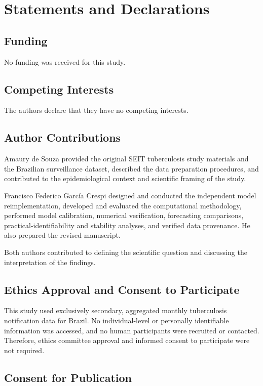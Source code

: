 \documentclass[pdflatex,sn-mathphys-ay]{sn-jnl}
\begin{document}
\section{Statements and Declarations}

\subsection{Funding}

No funding was received for this study.

\subsection{Competing Interests}

The authors declare that they have no competing interests.


\subsection{Author Contributions}

Amaury de Souza provided the original SEIT tuberculosis study materials and the Brazilian surveillance dataset, described the data preparation procedures, and contributed to the epidemiological context and scientific framing of the study.

Francisco Federico Garc\'ia Crespi designed and conducted the independent model reimplementation, developed and evaluated the computational methodology, performed model calibration, numerical verification, forecasting comparisons, practical-identifiability and stability analyses, and verified data provenance. He also prepared the revised manuscript.

Both authors contributed to defining the scientific question and discussing the interpretation of the findings.


\subsection{Ethics Approval and Consent to Participate}

This study used exclusively secondary, aggregated monthly tuberculosis notification data for Brazil. No individual-level or personally identifiable information was accessed, and no human participants were recruited or contacted. Therefore, ethics committee approval and informed consent to participate were not required.

\subsection{Consent for Publication}
\end{document}

